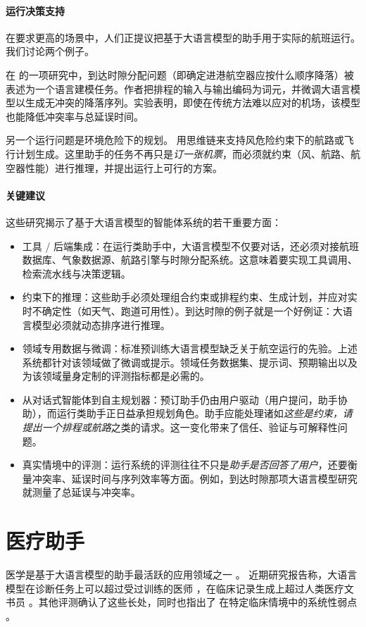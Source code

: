 \paragraph{运行决策支持}
在要求更高的场景中，人们正提议把基于大语言模型的助手用于实际的航班运行。我们讨论两个例子。

在 \citet{zhou2024flight} 的一项研究中，到达时隙分配问题（即确定进港航空器应按什么顺序降落）被表述为一个语言建模任务。作者把排程的输入与输出编码为词元，并微调大语言模型以生成无冲突的降落序列。实验表明，即使在传统方法难以应对的机场，该模型也能降低冲突率与总延误时间。

另一个运行问题是环境危险下的规划。\citet{tabrizian2024using} 用思维链来支持风危险约束下的航路或飞行计划生成。这里助手的任务不再只是{\em 订一张机票}，而必须就约束（风、航路、航空器性能）进行推理，并提出运行上可行的方案。

\paragraph{关键建议}
这些研究揭示了基于大语言模型的智能体系统的若干重要方面：

\begin{itemize}
    \item 工具 / 后端集成：在运行类助手中，大语言模型不仅要对话，还必须对接航班数据库、气象数据源、航路引擎与时隙分配系统。这意味着要实现工具调用、检索流水线与决策逻辑。
    \item 约束下的推理：这些助手必须处理组合约束或排程约束、生成计划，并应对实时不确定性（如天气、跑道可用性）。到达时隙的例子就是一个好例证：大语言模型必须就动态排序进行推理。
    \item 领域专用数据与微调：标准预训练大语言模型缺乏关于航空运行的先验。上述系统都针对该领域做了微调或提示。领域任务数据集、提示词、预期输出以及为该领域量身定制的评测指标都是必需的。
    \item 从对话式智能体到自主规划器：预订助手仍由用户驱动（用户提问，助手协助），而运行类助手正日益承担规划角色。助手应能处理诸如{\em 这些是约束，请提出一个排程或航路}之类的请求。这一变化带来了信任、验证与可解释性问题。
    \item 真实情境中的评测：运行系统的评测往往不只是{\em 助手是否回答了用户}，还要衡量冲突率、延误时间与序列效率等方面。例如，到达时隙那项大语言模型研究就测量了总延误与冲突率。
\end{itemize}



\section{医疗助手}
医学是基于大语言模型的助手最活跃的应用领域之一 \citep{thirunavukarasu2023large,clusmann2023future,mehandru2024evaluating}。
近期研究报告称，大语言模型在诊断任务上可以超过受过训练的医师
\citep{goh2024large}，在临床记录生成上超过人类医疗文书员
\citep{yuan2024continued}。其他评测确认了这些长处，同时也指出了
在特定临床情境中的系统性弱点 \citep{panagoulias2024evaluating}。

